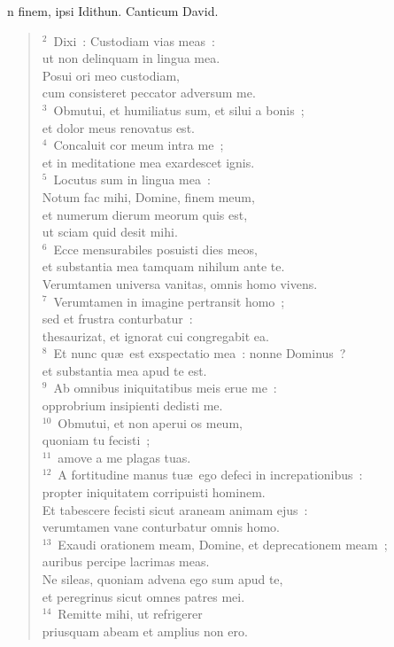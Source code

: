 \bchapter
{}n finem, ipsi Idithun. Canticum David.
\begin{flushleft}\begin{verse}\vspace{6pt}${}^{2}$~Dixi~: Custodiam vias meas~:\\ ut non delinquam in lingua mea.\\ Posui ori meo custodiam,\\ cum consisteret peccator adversum me.\\
${}^{3}$~Obmutui, et humiliatus sum, et silui a bonis~;\\ et dolor meus renovatus est.\\
${}^{4}$~Concaluit cor meum intra me~;\\ et in meditatione mea exardescet ignis.\\
${}^{5}$~Locutus sum in lingua mea~:\\ Notum fac mihi, Domine, finem meum,\\ et numerum dierum meorum quis est,\\ ut sciam quid desit mihi.\\
${}^{6}$~Ecce mensurabiles posuisti dies meos,\\ et substantia mea tamquam nihilum ante te.\\ Verumtamen universa vanitas, omnis homo vivens.\\
${}^{7}$~Verumtamen in imagine pertransit homo~;\\ sed et frustra conturbatur~:\\ thesaurizat, et ignorat cui congregabit ea.\\
${}^{8}$~Et nunc qu\ae\ est exspectatio mea~: nonne Dominus~?\\ et substantia mea apud te est.\\
${}^{9}$~Ab omnibus iniquitatibus meis erue me~:\\ opprobrium insipienti dedisti me.\\
${}^{10}$~Obmutui, et non aperui os meum,\\ quoniam tu fecisti~;\\
${}^{11}$~amove a me plagas tuas.\\
${}^{12}$~A fortitudine manus tu\ae\ ego defeci in increpationibus~:\\ propter iniquitatem corripuisti hominem.\\ Et tabescere fecisti sicut araneam animam ejus~:\\ verumtamen vane conturbatur omnis homo.\\
${}^{13}$~Exaudi orationem meam, Domine, et deprecationem meam~;\\ auribus percipe lacrimas meas.\\ Ne sileas, quoniam advena ego sum apud te,\\ et peregrinus sicut omnes patres mei.\\
${}^{14}$~Remitte mihi, ut refrigerer\\ priusquam abeam et amplius non ero.\end{verse}\end{flushleft}



